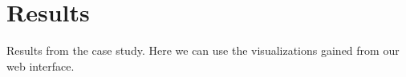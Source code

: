 
\chapter{Results}

Results from the case study.
Here we can use the visualizations gained from our web interface.

\cleardoublepage